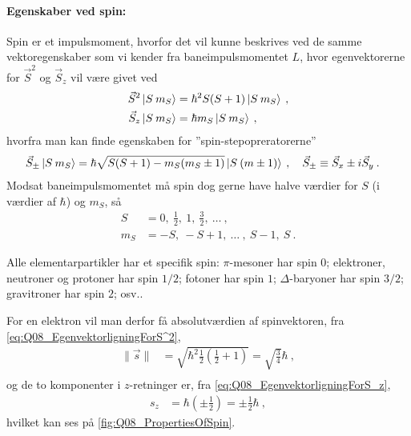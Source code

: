 \paragraph{Egenskaber ved spin:} Spin er et impulsmoment, hvorfor det vil kunne beskrives ved de samme vektoregenskaber som vi kender fra baneimpulsmomentet $L$, hvor egenvektorerne for $\Vec{S}^2$ og $\Vec{S}_z$ vil være givet ved
\begin{align}
    \Vec{S}^2\ket{S \: m_S} &= \hbar^2 S(S+1) \ket{S \: m_S} \label{eq:Q08_EgenvektorligningForS^2} \: , \\
    \Vec{S}_z\ket{S \: m_S} &= \hbar m_S \ket{S \: m_S} \: , \label{eq:Q08_EgenvektorligningForS_z}
\end{align}
hvorfra man kan finde egenskaben for ''spin-stepopreratorerne''
\begin{align}
    \Vec{S}_\pm \ket{S \: m_S} &= \hbar \sqrt{S(S+1) - m_S(m_S \pm 1)} \ket{S \: (m \pm 1)} \: , \quad \Vec{S}_\pm \equiv \Vec{S}_x \pm i \Vec{S}_y \: .
\end{align}
\noindent
Modsat baneimpulsmomentet må spin dog gerne have halve værdier for $S$ (i værdier af $\hbar$) og $m_S$, så
\begin{align}
    S &= 0, \: \frac{1}{2}, \: 1, \: \frac{3}{2}, \: \ldots \: , \\
    m_S &= -S, \: -S + 1, \: \ldots \: , \: S - 1, \: S \: .
\end{align}

Alle elementarpartikler har et specifik spin: $\pi$-mesoner har spin $0$; elektroner, neutroner og protoner har spin $1/2$; fotoner har spin $1$; $\Delta$-baryoner har spin $3/2$; gravitroner har spin $2$; osv..

\noindent
For en elektron vil man derfor få absolutværdien af spinvektoren, fra \cref{eq:Q08_EgenvektorligningForS^2},
\begin{align}
    \| \Vec{s} \| &= \sqrt{\hbar^2 \frac{1}{2}\left(\frac{1}{2}+1\right)} = \sqrt{\frac{3}{4}}\hbar  \: , \\
\end{align}
og de to komponenter i $z$-retninger er, fra \cref{eq:Q08_EgenvektorligningForS_z},
\begin{align}
    s_z &= \hbar \left(\pm \frac{1}{2}\right) = \pm \frac{1}{2}\hbar \: ,
\end{align}
hvilket kan ses på \cref{fig:Q08_PropertiesOfSpin}.


